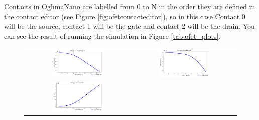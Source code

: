 Contacts in OghmaNano are labelled from 0 to N in the order they are defined in the contact editor (see Figure \ref{fig:ofetcontacteditor}), so in this case Contact 0 will be the source, contact 1 will be the gate and contact 2 will be the drain. You can see the result of running the simulation in Figure \ref{tab:ofet_plots}.
\begin{figure}[H]
\centering
\begin{tabular}{ c c }

\includegraphics[width=0.5\textwidth,height=0.4\textwidth]{./images/ofet/ofet_7.png}

&
\includegraphics[width=0.5\textwidth,height=0.4\textwidth]{./images/ofet/ofet_8.png}
\\

\includegraphics[width=0.5\textwidth,height=0.4\textwidth]{./images/ofet/ofet_9.png}


\end{tabular}
\end{figure}
